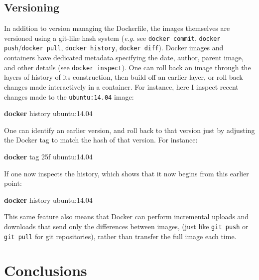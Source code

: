 \documentclass[9pt]{components/acm_proc_article-sp}
\newenvironment{Shaded}{\begin{snugshade}}{\end{snugshade}}
\newcommand{\KeywordTok}[1]{\textcolor[rgb]{0.13,0.29,0.53}{\textbf{{#1}}}}
\newcommand{\NormalTok}[1]{{#1}}
\begin{document}
\subsection{Versioning}\label{versioning}

In addition to version managing the Dockerfile, the images themselves
are versioned using a git-like hash system (\emph{e.g.} see
\texttt{docker commit}, \texttt{docker push}/\texttt{docker pull},
\texttt{docker history}, \texttt{docker diff}). Docker images and
containers have dedicated metadata specifying the date, author, parent
image, and other details (see \texttt{docker inspect}). One can roll
back an image through the layers of history of its construction, then
build off an earlier layer, or roll back changes made interactively in a
container. For instance, here I inspect recent changes made to the
\texttt{ubuntu:14.04} image:

\begin{Shaded}
\begin{Highlighting}[]
\KeywordTok{docker} \NormalTok{history ubuntu:14.04}
\end{Highlighting}
\end{Shaded}

One can identify an earlier version, and roll back to that version just
by adjusting the Docker tag to match the hash of that version. For
instance:

\begin{Shaded}
\begin{Highlighting}[]
\KeywordTok{docker} \NormalTok{tag 25f ubuntu:14.04}
\end{Highlighting}
\end{Shaded}

If one now inspects the history, which shows that it now begins from
this earlier point:

\begin{Shaded}
\begin{Highlighting}[]
\KeywordTok{docker} \NormalTok{history ubuntu:14.04}
\end{Highlighting}
\end{Shaded}

This same feature also means that Docker can perform incremental uploads
and downloads that send only the differences between images, (just like
\texttt{git push} or \texttt{git pull} for git repositories), rather
than transfer the full image each time.

\section{Conclusions}\label{conclusions}
\end{document}
